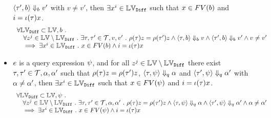 \begin{lem}
\begin{itemize}
	$\langle \mathtt{\tau}', b \rangle \Downarrow_b v'$ with $v \neq v'$,
	then $\exists x^i \in \mathbb{LV}_{\mathtt{Diff}} $ 
	such that $x \in FV(b)$ and $i = \iota(\mathtt{\tau}) x$.
	\[
		\begin{array}{l}
		\forall \mathbb{LV}_{\mathtt{Diff}}  \subset \mathbb{LV},  
		b ~.~ 
		\\ \quad
		\forall z^j \in \mathbb{LV} \setminus \mathbb{LV}_{\mathtt{Diff}} ~.~  
		\exists \mathtt{\tau}, \mathtt{\tau}' \in \mathcal{T}, v, v' ~.~  
		\rho(\mathtt{\tau}) z = \rho(\mathtt{\tau}') z 
		\land 
		\langle \mathtt{\tau}, b \rangle \Downarrow_b v 
		\land \langle \mathtt{\tau}', b \rangle \Downarrow_b v' \land v \neq v'
		\\ \quad
		\implies \exists x^i \in \mathbb{LV}_{\mathtt{Diff}} ~.~  
		x \in FV(b) \land i = \iota(\mathtt{\tau}) x
		\end{array}
	\]
% 
	\item $e$ is a query expression $\psi$,
	and for all $z^j \in \mathbb{LV} \setminus \mathbb{LV}_{\mathtt{Diff}}$ 
	there exist $\mathtt{\tau}, \mathtt{\tau}' \in \mathcal{T}, \alpha, \alpha'$ such that 
	$\rho(\mathtt{\tau}) z = \rho(\mathtt{\tau}') z$,
	$\langle \mathtt{\tau}, \psi \rangle \Downarrow_q \alpha$ and 
	$\langle \mathtt{\tau}', \psi \rangle \Downarrow_q \alpha'$ with $\alpha \neq \alpha'$,
	then $\exists x^i \in \mathbb{LV}_{\mathtt{Diff}} $ 
	such that $x \in FV(\psi)$ and $i = \iota(\mathtt{\tau}) x$.
	\[
		\begin{array}{l}
		\forall \mathbb{LV}_{\mathtt{Diff}}  \subset \mathbb{LV},  
		\psi ~.~ 
		\\ \quad
		\forall z^j \in \mathbb{LV} \setminus \mathbb{LV}_{\mathtt{Diff}} ~.~  
		\exists \mathtt{\tau}, \mathtt{\tau}' \in \mathcal{T}, \alpha, \alpha' ~.~  
		\rho(\mathtt{\tau}) z = \rho(\mathtt{\tau}') z 
		\land 
		\langle \mathtt{\tau}, \psi \rangle \Downarrow_q \alpha 
		\land \langle \mathtt{\tau}', \psi \rangle \Downarrow_q \alpha' \land \alpha \neq \alpha'
		\\ \quad
		\implies \exists x^i \in \mathbb{LV}_{\mathtt{Diff}} ~.~  
		x \in FV(\psi) \land i = \iota(\mathtt{\tau}) x
		\end{array}
	\]
	\end{itemize}
	\end{lem}
